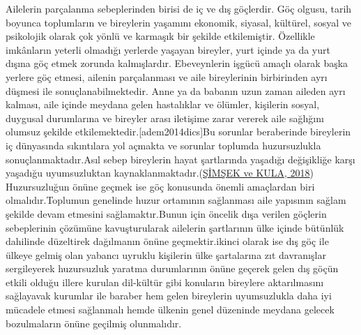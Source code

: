 \documentclass[
  12pt,
]{article}
\begin{document}
Ailelerin parçalanma sebeplerinden birisi de iç ve dış göçlerdir. Göç olgusu, tarih boyunca toplumların ve bireylerin yaşamını ekonomik, siyasal, kültürel, sosyal ve psikolojik olarak çok yönlü ve karmaşık bir şekilde etkilemiştir. Özellikle imkânların yeterli olmadığı yerlerde yaşayan bireyler, yurt içinde ya da yurt dışına göç etmek zorunda kalmışlardır. Ebeveynlerin işgücü amaçlı olarak başka yerlere göç etmesi, ailenin parçalanması ve aile bireylerinin birbirinden ayrı düşmesi ile sonuçlanabilmektedir. Anne ya da babanın uzun zaman aileden ayrı kalması, aile içinde meydana gelen hastalıklar ve ölümler, kişilerin sosyal, duygusal durumlarına ve bireyler arası iletişime zarar vererek aile sağlığını olumsuz şekilde etkilemektedir.{[}adem2014dics{]}Bu sorunlar beraberinde bireylerin iç dünyasında sıkıntılara yol açmakta ve sorunlar toplumda huzursuzlukla sonuçlanmaktadır.Asıl sebep bireylerin hayat şartlarında yaşadığı değişikliğe karşı yaşadığu uyumsuzluktan kaynaklanmaktadır.(\protect\hyperlink{ref-csimcsek2018turkiye}{ŞİMŞEK ve KULA, 2018}) Huzursuzluğun önüne geçmek ise göç konusunda önemli amaçlardan biri olmalıdır.Toplumun genelinde huzur ortamının sağlanması aile yapısının sağlam şekilde devam etmesini sağlamaktır.Bunun için öncelik dışa verilen göçlerin sebeplerinin çözümüne kavuşturularak ailelerin şartlarının ülke içinde bütünlük dahilinde düzeltirek dağılmanın önüne geçmektir.ikinci olarak ise dış göç ile ülkeye gelmiş olan yabancı uyruklu kişilerin ülke şartalarına zıt davranışlar sergileyerek huzursuzluk yaratma durumlarının önüne geçerek gelen dış göçün etkili olduğu illere kurulan dil-kültür gibi konuların bireylere aktarılmasını sağlayavak kurumlar ile baraber hem gelen bireylerin uyumsuzlukla daha iyi mücadele etmesi sağlanmalı hemde ülkenin genel düzeninde meydana gelecek bozulmaların önüne geçilmiş olunmalıdır.
\end{document}
